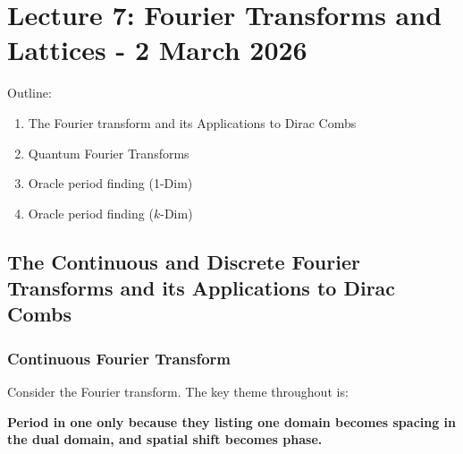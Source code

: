 \section{Lecture 7: Fourier Transforms and Lattices - 2 March 2026}
Outline: 
\begin{enumerate}[label=(\Roman*)]
    \item The Fourier transform and its Applications to Dirac Combs
    \item Quantum Fourier Transforms
    \item Oracle period finding (1-Dim)
    \item Oracle period finding ($k$-Dim)
\end{enumerate}

\subsection{The Continuous and Discrete Fourier Transforms and its Applications to Dirac Combs}
\subsubsection{Continuous Fourier Transform}
Consider the Fourier transform. The key theme throughout is:
\begin{center}
\textbf{Period in one only because they listing one domain becomes spacing in the dual domain, and spatial shift becomes phase.} 
\end{center}

